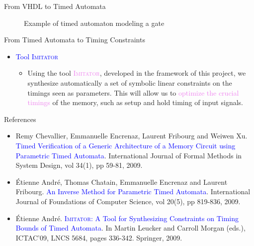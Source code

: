 \documentclass[final]{beamer}
\newcommand{\couleur}[1]{\textcolor{violet}{#1}}
\newcommand{\coulitem}[1]{\textcolor{blue}{#1}}
\newcommand{\imitator}{\textsc{Imitator}}
\begin{document}
\begin{frame}{}
\begin{columns}[t]
\begin{column}{.45\linewidth}
\begin{block}{From VHDL to Timed Automata}
\begin{itemize}
\begin{figure}
{\begin{tikzpicture}[->, auto,node distance=5cm, thin]
\end{tikzpicture}

}
\caption{Example of timed automaton modeling a gate}
\label{fig:PTA-not}
\end{figure}

\end{itemize}

\end{block}    

\begin{block}{From Timed Automata to Timing Constraints}

\begin{itemize}
	\item \coulitem{Tool \imitator{}}
	\begin{itemize}
		\item Using the tool \couleur{\imitator{}}, developed in the framework of this project, we synthesize automatically a set of symbolic linear constraints on the timings seen as parameters.
		This will allow us to \couleur{optimize the crucial timings} of the memory, such as setup and hold timing of input signals.
	\end{itemize}
\end{itemize}

\end{block}    


\begin{block}{References}

\begin{itemize}
	\item Remy Chevallier, Emmanuelle Encrenaz, Laurent Fribourg and Weiwen Xu.
	\coulitem{Timed Verification of a Generic Architecture of a Memory Circuit using Parametric Timed Automata}.
	International Journal of Formal Methods in System Design, vol 34(1), pp 59-81, 2009.
	
	\item \'Etienne Andr\'e, Thomas Chatain, Emmanuelle Encrenaz and Laurent Fribourg.
	\coulitem{An Inverse Method for Parametric Timed Automata}.
	International Journal of Foundations of Computer Science, vol 20(5), pp 819-836, 2009.
	
	\item \'Etienne Andr\'e.
	\coulitem{\imitator{}: A Tool for Synthesizing Constraints on Timing Bounds of Timed Automata}.
	In Martin Leucker and Carroll Morgan (eds.), ICTAC'09, LNCS 5684, pages 336-342. Springer, 2009.
\end{itemize}


\end{block}
\end{column}
\end{columns}
\end{frame}
\end{document}
